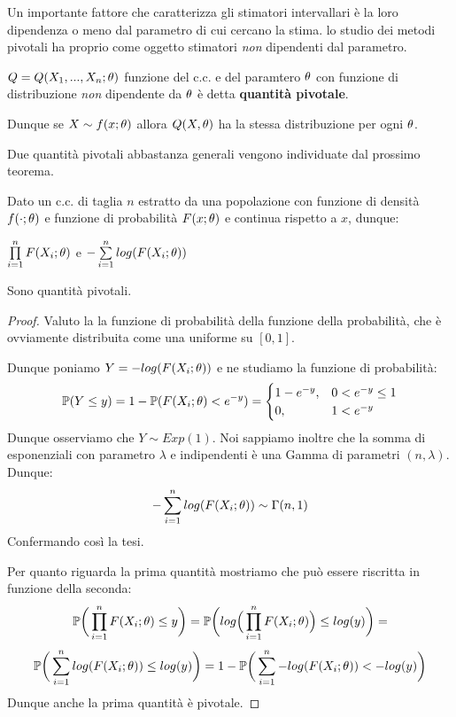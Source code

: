 Un importante fattore che caratterizza gli stimatori intervallari è la loro dipendenza o meno dal parametro di cui cercano la stima. lo studio dei metodi pivotali ha proprio come oggetto stimatori \textit{non} dipendenti dal parametro.

\begin{definition}
$Q=Q(X_1,...,X_n;\theta)$ funzione del c.c. e del paramtero $\theta$ con funzione di distribuzione \textit{non} dipendente da $\theta$ è detta \textbf{quantità pivotale}.
\end{definition}

Dunque se $X\sim f(x;\theta)$ allora $Q(X,\theta)$ ha la stessa distribuzione per ogni $\theta$.

Due quantità pivotali abbastanza generali vengono individuate dal prossimo teorema.


\begin{theorem}
Dato un c.c. di taglia $n$ estratto da una popolazione con funzione di densità $f(\cdot;\theta)$ e funzione di probabilità $F(x;\theta)$ e continua rispetto a $x$, dunque: 
\begin{center}
    $\prod\limits_{i=1}^nF(X_i;\theta)$ e $-\sum\limits_{i=1}^nlog(F(X_i;\theta))$
\end{center}
Sono quantità pivotali.

\begin{proof}
Valuto la la funzione di probabilità della funzione della probabilità, che è ovviamente distribuita come una uniforme su $[0,1]$.

Dunque poniamo $Y=-log(F(X_i;\theta))$ e ne studiamo la funzione di probabilità:
\[\mathbb{P}(Y\leq y)=1-\mathbb{P}(F(X_i;\theta)<e^{-y})=\begin{cases} 1-e^{-y}, & 0<e^{-y}\leq1 \\ 0, & 1<e^{-y}
\end{cases}\]
Dunque osserviamo che $Y\sim Exp(1)$. Noi sappiamo inoltre che la somma di esponenziali con parametro $\lambda$ e indipendenti è una Gamma di parametri $(n,\lambda)$. Dunque: \[-\sum\limits_{i=1}^nlog(F(X_i;\theta))\sim\Gamma(n,1)\]
Confermando così la tesi.

Per quanto riguarda la prima quantità mostriamo che può essere riscritta in funzione della seconda:
\[\mathbb{P}\bigg(\prod_{i=1}^nF(X_i;\theta)\leq y\bigg)=\mathbb{P}\bigg(log\Big(\prod_{i=1}^nF(X_i;\theta)\Big)\leq log(y)\bigg)=\]
\[\mathbb{P}\bigg(\sum\limits_{i=1}^nlog(F(X_i;\theta))\leq log(y)\bigg)=1-\mathbb{P}\bigg(\sum\limits_{i=1}^n-log(F(X_i;\theta))<-log(y)\bigg)\]
Dunque anche la prima quantità è pivotale.
\end{proof}
\end{theorem}